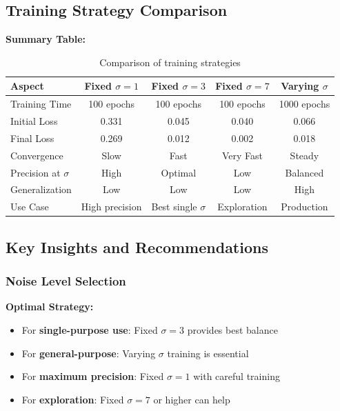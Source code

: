 \documentclass[12pt,a4paper]{article}
\begin{document}
\subsection{Training Strategy Comparison}

\textbf{Summary Table:}

\begin{table}[H]
\centering
\begin{tabular}{lcccc}
\toprule
Aspect & Fixed $\sigma=1$ & Fixed $\sigma=3$ & Fixed $\sigma=7$ & Varying $\sigma$ \\
\midrule
Training Time & 100 epochs & 100 epochs & 100 epochs & 1000 epochs \\
Initial Loss & 0.331 & 0.045 & 0.040 & 0.066 \\
Final Loss & 0.269 & 0.012 & 0.002 & 0.018 \\
Convergence & Slow & Fast & Very Fast & Steady \\
Precision at $\sigma$ & High & Optimal & Low & Balanced \\
Generalization & Low & Low & Low & High \\
Use Case & High precision & Best single $\sigma$ & Exploration & Production \\
\bottomrule
\end{tabular}
\caption{Comparison of training strategies}
\label{tab:training_comparison}
\end{table}

\subsection{Key Insights and Recommendations}

\subsubsection{Noise Level Selection}

\textbf{Optimal Strategy:}
\begin{itemize}
    \item For \textbf{single-purpose use}: Fixed $\sigma = 3$ provides best balance
    \item For \textbf{general-purpose}: Varying $\sigma$ training is essential
    \item For \textbf{maximum precision}: Fixed $\sigma = 1$ with careful training
    \item For \textbf{exploration}: Fixed $\sigma = 7$ or higher can help
\end{itemize}
\end{document}
